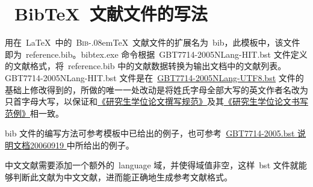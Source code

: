 \section{~BibTeX~文献文件的写法}

用在~\LaTeX~中的~\textsc{Bib}\kern-.08em\TeX~文献文件的扩展名为~bib，此模板中，该文件即为~reference.bib。bibtex.exe 命令根据~GBT7714-2005NLang-HIT.bst 文件定义的文献格式，将~reference.bib 中的文献数据转换为输出文档中的文献列表。GBT7714-2005NLang-HIT.bst 文件是在~\href{http://bbs.ctex.org/attachment.php?aid=MjA3MDh8ZDcyMjc2MTN8MTMyNTYzNjY4OHxhZTg4bkNCUVJiRzA0WmU3TmlMbVdTUVExa0xtV2puWWc0dkdqbVJhbTVMdy9mVQ\%3D\%3D}{GBT7714-2005NLang-UTF8.bst} 文件的基础上修改得到的，所做的唯一一处改动是将姓氏字母全部大写的英文作者名改为只首字母大写，以保证和\href{http://219.217.226.141/xuewei/guifan.doc}{《研究生学位论文撰写规范》}及其\href{http://219.217.226.141/xuewei/fanli.doc}{《研究生学位论文书写范例》}相一致。

bib 文件的编写方法可参考模板中已给出的例子，也可参考~\href{http://bbs.ctex.org/attachment.php?aid=MTk3OTd8NjY1ODc5OGV8MTMyNTY0MTEyMnxhZGZkYWpsa0I2RGZwNDR5Z1lyeStjb1dKRS8rTnJub3lvT2FkNDNJbHl1UWVkVQ\%3D\%3D}{GBT7714-2005.bst 说明文档20060919
} 中所给出的例子。

中文文献需要添加一个额外的~language 域，并使得域值非空，这样~bst 文件就能够判断此文献为中文文献，进而能正确地生成参考文献格式。

